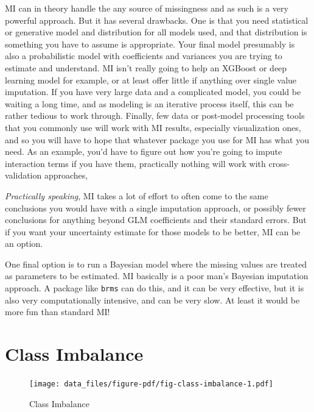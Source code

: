 \documentclass[
  letterpaper,
]{krantz}
\begin{document}
MI can in theory handle the any source of missingness and as such is a
very powerful approach. But it has several drawbacks. One is that you
need statistical or generative model and distribution for all models
used, and that distribution is something you have to assume is
appropriate. Your final model presumably is also a probabilistic model
with coefficients and variances you are trying to estimate and
understand. MI isn't really going to help an XGBoost or deep learning
model for example, or at least offer little if anything over single
value imputation. If you have very large data and a complicated model,
you could be waiting a long time, and as modeling is an iterative
process itself, this can be rather tedious to work through. Finally, few
data or post-model processing tools that you commonly use will work with
MI results, especially visualization ones, and so you will have to hope
that whatever package you use for MI has what you need. As an example,
you'd have to figure out how you're going to impute interaction terms if
you have them, practically nothing will work with cross-validation
approaches,

\emph{Practically speaking}, MI takes a lot of effort to often come to
the same conclusions you would have with a single imputation approach,
or possibly fewer conclusions for anything beyond GLM coefficients and
their standard errors. But if you want your uncertainty estimate for
those models to be better, MI can be an option.

One final option is to run a Bayesian model where the missing values are
treated as parameters to be estimated. MI basically is a poor man's
Bayesian imputation approach. A package like \texttt{brms} can do this,
and it can be very effective, but it is also very computationally
intensive, and can be very slow. At least it would be more fun than
standard MI!

\section{Class Imbalance}\label{sec-class-imbalance}

\begin{figure}

{\centering \texttt{[image: data\_files/figure-pdf/fig-class-imbalance-1.pdf]}

}

\caption{\label{fig-class-imbalance}Class Imbalance}

\end{figure}
\end{document}
